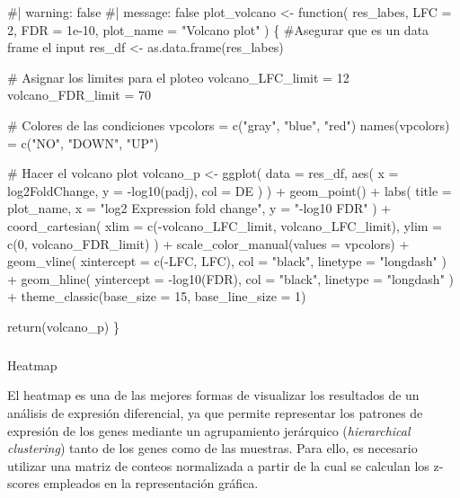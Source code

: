 \documentclass[
  10pt,
]{article}
\makeatletter
\let\oldsubparagraph\subparagraph
\renewcommand{\subparagraph}{
    \@ifstar
      \xxxSubParagraphStar
      \xxxSubParagraphNoStar
  }
\newcommand{\xxxSubParagraphStar}[1]{\oldsubparagraph*{#1}\mbox{}}
\newcommand{\xxxSubParagraphNoStar}[1]{\oldsubparagraph{#1}\mbox{}}
\newenvironment{Shaded}{\begin{snugshade}}{\end{snugshade}}
\newcommand{\NormalTok}[1]{\textcolor[rgb]{0.00,0.23,0.31}{#1}}
\makeatother
\begin{document}
\begin{Shaded}
\begin{Highlighting}[]
\NormalTok{\#| warning: false}
\NormalTok{\#| message: false}
\NormalTok{plot\_volcano \textless{}{-} function(}
\NormalTok{  res\_labes,}
\NormalTok{  LFC = 2,}
\NormalTok{  FDR = 1e{-}10,}
\NormalTok{  plot\_name = "Volcano plot"}
\NormalTok{) \{}
\NormalTok{  \#Asegurar que es un data frame el input}
\NormalTok{  res\_df \textless{}{-} as.data.frame(res\_labes)}

\NormalTok{  \# Asignar los limites para el ploteo}
\NormalTok{  volcano\_LFC\_limit = 12}
\NormalTok{  volcano\_FDR\_limit = 70}

\NormalTok{  \# Colores de las condiciones}
\NormalTok{  vpcolors = c("gray", "blue", "red")}
\NormalTok{  names(vpcolors) = c("NO", "DOWN", "UP")}

\NormalTok{  \# Hacer el volcano plot}
\NormalTok{  volcano\_p \textless{}{-} ggplot(}
\NormalTok{    data = res\_df,}
\NormalTok{    aes(}
\NormalTok{      x = log2FoldChange,}
\NormalTok{      y = {-}log10(padj),}
\NormalTok{      col = DE}
\NormalTok{    )}
\NormalTok{  ) +}
\NormalTok{    geom\_point() +}
\NormalTok{    labs(}
\NormalTok{      title = plot\_name,}
\NormalTok{      x = "log2 Expression fold change",}
\NormalTok{      y = "{-}log10 FDR"}
\NormalTok{    ) +}
\NormalTok{    coord\_cartesian(}
\NormalTok{      xlim = c({-}volcano\_LFC\_limit, volcano\_LFC\_limit),}
\NormalTok{      ylim = c(0, volcano\_FDR\_limit)}
\NormalTok{    ) +}
\NormalTok{    scale\_color\_manual(values = vpcolors) +}
\NormalTok{    geom\_vline(}
\NormalTok{      xintercept = c({-}LFC, LFC),}
\NormalTok{      col = "black",}
\NormalTok{      linetype = "longdash"}
\NormalTok{    ) +}
\NormalTok{    geom\_hline(}
\NormalTok{      yintercept = {-}log10(FDR),}
\NormalTok{      col = "black",}
\NormalTok{      linetype = "longdash"}
\NormalTok{    ) +}
\NormalTok{    theme\_classic(base\_size = 15, base\_line\_size = 1)}

\NormalTok{  return(volcano\_p)}
\NormalTok{\}}
\end{Highlighting}
\end{Shaded}

\subparagraph{Heatmap}\label{heatmap}

El heatmap es una de las mejores formas de visualizar los resultados de
un análisis de expresión diferencial, ya que permite representar los
patrones de expresión de los genes mediante un agrupamiento jerárquico
(\emph{hierarchical clustering}) tanto de los genes como de las
muestras. Para ello, es necesario utilizar una matriz de conteos
normalizada a partir de la cual se calculan los z-scores empleados en la
representación gráfica.
\end{document}
